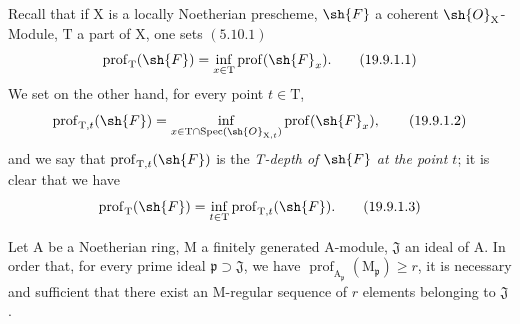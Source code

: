 \begin{env}[19.9.1]
\label{IV.19.9.1}
Recall that if $\mathrm{X}$ is a locally Noetherian prescheme, $\sh{F}$ a coherent $\sh{O}_\mathrm{X}$-Module, $\mathrm{T}$ a part of $\mathrm{X}$, one sets $(5.10.1)$
\begin{equation}
  \operatorname{prof}_\mathrm{T}(\sh{F})=\inf_{x\in\mathrm{T}}\operatorname{prof}(\sh{F}_x).
  \tag{19.9.1.1}
\end{equation}
We set on the other hand, for every point $t\in\mathrm{T}$,
\begin{equation}
  \operatorname{prof}_{\mathrm{T},t}(\sh{F})=\inf_{x\in\mathrm{T}\cap\operatorname{Spec}(\sh{O}_{\mathrm{X},t})}\operatorname{prof}(\sh{F}_x),
  \tag{19.9.1.2}
\end{equation}
and we say that $\operatorname{prof}_{\mathrm{T},t}(\sh{F})$ is the \emph{T-depth of $\sh{F}$ at the point $t$}; it is clear that we have
\begin{equation}
  \operatorname{prof}_\mathrm{T}(\sh{F})=\inf_{t\in\mathrm{T}}\operatorname{prof}_{\mathrm{T},t}(\sh{F}).
  \tag{19.9.1.3}
\end{equation}
\end{env}

\begin{lemma}[19.9.2]
\label{IV.19.9.2}
Let $\mathrm{A}$ be a Noetherian ring, $\mathrm{M}$ a finitely generated $\mathrm{A}$-module, $\mathfrak{J}$ an ideal of $\mathrm{A}$. In order that, for every prime ideal $\mathfrak{p}\supset\mathfrak{J}$, we have $\operatorname{prof}_{\mathrm{A}_\mathfrak{p}}(\mathrm{M}_\mathfrak{p})\geqslant r$, it is necessary and sufficient that there exist an M-regular sequence of $r$ elements belonging to $\mathfrak{J}$.
\end{lemma}

